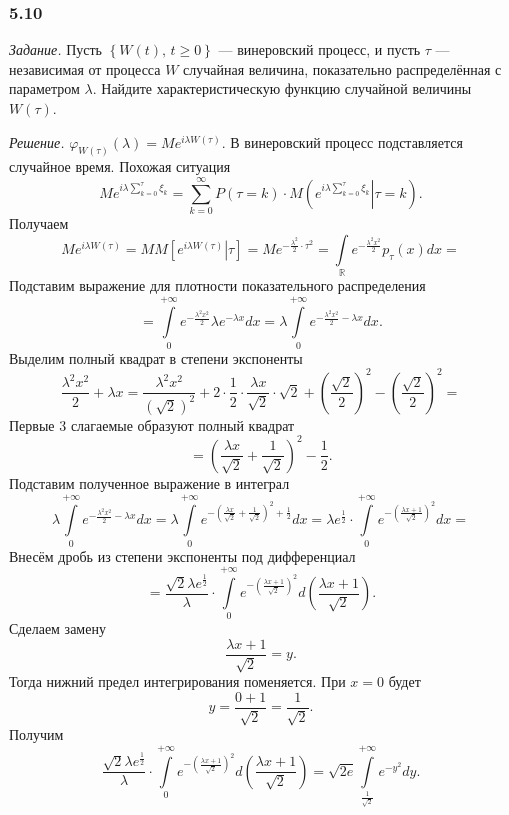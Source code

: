 \subsubsection*{5.10}

\textit{Задание.}
Пусть $ \left\{ W \left( t \right), \, t \geq 0 \right\} $ --- винеровский процесс,
и пусть $ \tau $ --- независимая от процесса $W$ случайная величина,
показательно распределённая с параметром $ \lambda $.
Найдите характеристическую функцию случайной величины $W \left( \tau \right) $.

\textit{Решение.}
$ \varphi_{W \left( \tau \right) } \left( \lambda \right) =
  Me^{i \lambda W \left( \tau \right) }$.
В винеровский процесс подставляется случайное время.
Похожая ситуация
$$Me^{i \lambda \sum \limits_{k = 0}^{ \tau } \xi_k} =
  \sum \limits_{k = 0}^{ \infty }
    P \left( \tau = k \right) \cdot
    M \left( \left. e^{i \lambda \sum \limits_{k = 0}^{ \tau } \xi_k} \right| \tau = k \right).$$
Получаем
$$Me^{i \lambda W \left( \tau \right) } =
  MM \left[ \left. e^{i \lambda W \left( \tau \right) } \right| \tau \right] =
  Me^{-\frac{ \lambda^2}{2} \cdot \tau^2 } =
  \int \limits_{ \mathbb{R}} e^{-\frac{ \lambda^2 x^2}{2}} p_{ \tau } \left( x \right) dx =$$
Подставим выражение для плотности показательного распределения
$$= \int \limits_0^{+\infty } e^{-\frac{ \lambda^2 x^2}{2}} \lambda e^{-\lambda x} dx =
  \lambda \int \limits_0^{+\infty } e^{-\frac{ \lambda^2 x^2}{2} - \lambda x} dx.$$
Выделим полный квадрат в степени экспоненты
$$ \frac{ \lambda^2 x^2}{2} + \lambda x =
  \frac{ \lambda^2 x^2}{ \left( \sqrt{2} \right)^2} +
  2 \cdot \frac{1}{2} \cdot \frac{ \lambda x}{ \sqrt{2}} \cdot \sqrt{2} +
  \left( \frac{ \sqrt{2}}{2} \right)^2 - \left( \frac{ \sqrt{2}}{2} \right)^2 =$$
Первые 3 слагаемые образуют полный квадрат
$$= \left( \frac{ \lambda x}{ \sqrt{2}} + \frac{1}{ \sqrt{2}} \right)^2 - \frac{1}{2}.$$
Подставим полученное выражение в интеграл
$$\lambda \int \limits_0^{+\infty } e^{-\frac{ \lambda^2 x^2}{2} - \lambda x} dx =
  \lambda \int \limits_0^{+\infty }
    e^{-\left( \frac{ \lambda x}{ \sqrt{2}} + \frac{1}{ \sqrt{2}} \right)^2 + \frac{1}{2}} dx =
  \lambda e^{ \frac{1}{2}} \cdot
  \int \limits_0^{+ \infty } e^{-\left( \frac{ \lambda x + 1}{ \sqrt{2}} \right)^2} dx =$$
Внесём дробь из степени экспоненты под дифференциал
$$= \frac{ \sqrt{2} \lambda e^{ \frac{1}{2}}}{ \lambda } \cdot
  \int \limits_0^{+\infty }
    e^{-\left( \frac{ \lambda x + 1}{ \sqrt{2}} \right)^2}
  d \left( \frac{ \lambda x + 1}{ \sqrt{2}} \right).$$
Сделаем замену
$$ \frac{ \lambda x + 1}{ \sqrt{2}} =
  y.$$
Тогда нижний предел интегрирования поменяется.
При $x = 0$ будет
$$y =
  \frac{0 + 1}{ \sqrt{2}} =
  \frac{1}{ \sqrt{2}}.$$
Получим
$$ \frac{ \sqrt{2} \lambda e^{ \frac{1}{2}}}{ \lambda } \cdot
  \int \limits_0^{+\infty }
    e^{-\left( \frac{ \lambda x + 1}{ \sqrt{2}} \right)^2}
  d \left( \frac{ \lambda x + 1}{ \sqrt{2}} \right) =
  \sqrt{2e} \int \limits_{ \frac{1}{ \sqrt{2}}}^{+\infty } e^{-y^2} dy.$$

